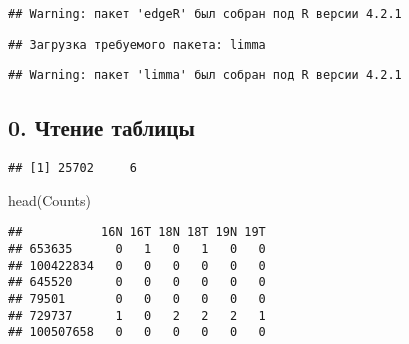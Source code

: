 \documentclass[
]{article}
\newenvironment{Shaded}{\begin{snugshade}}{\end{snugshade}}
\newcommand{\FunctionTok}[1]{\textcolor[rgb]{0.00,0.00,0.00}{#1}}
\newcommand{\NormalTok}[1]{#1}
\newcommand{\OtherTok}[1]{\textcolor[rgb]{0.56,0.35,0.01}{#1}}
\newcommand{\SpecialCharTok}[1]{\textcolor[rgb]{0.00,0.00,0.00}{#1}}
\newcommand{\StringTok}[1]{\textcolor[rgb]{0.31,0.60,0.02}{#1}}
\begin{document}
\begin{verbatim}
## Warning: пакет 'edgeR' был собран под R версии 4.2.1
\end{verbatim}

\begin{verbatim}
## Загрузка требуемого пакета: limma
\end{verbatim}

\begin{verbatim}
## Warning: пакет 'limma' был собран под R версии 4.2.1
\end{verbatim}

\hypertarget{ux447ux442ux435ux43dux438ux435-ux442ux430ux431ux43bux438ux446ux44b}{%
\subsection{0. Чтение
таблицы}\label{ux447ux442ux435ux43dux438ux435-ux442ux430ux431ux43bux438ux446ux44b}}

\begin{Shaded}
\end{Shaded}

\begin{verbatim}
## [1] 25702     6
\end{verbatim}

\begin{Shaded}
\begin{Highlighting}[]
\FunctionTok{head}\NormalTok{(Counts)}
\end{Highlighting}
\end{Shaded}

\begin{verbatim}
##           16N 16T 18N 18T 19N 19T
## 653635      0   1   0   1   0   0
## 100422834   0   0   0   0   0   0
## 645520      0   0   0   0   0   0
## 79501       0   0   0   0   0   0
## 729737      1   0   2   2   2   1
## 100507658   0   0   0   0   0   0
\end{verbatim}
\end{document}
